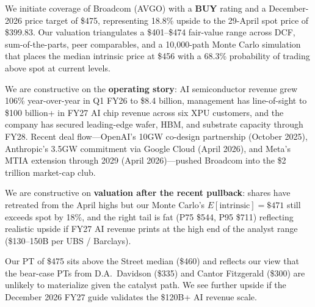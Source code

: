 \documentclass[10pt,letterpaper]{article}
\begin{document}
\begin{minipage}[t]{0.55\textwidth}
We initiate coverage of Broadcom (AVGO) with a \textbf{BUY} rating and a December-2026 price target of \$475, representing 18.8\% upside to the 29-April spot price of \$399.83. Our valuation triangulates a \$401--\$474 fair-value range across DCF, sum-of-the-parts, peer comparables, and a 10{,}000-path Monte Carlo simulation that places the median intrinsic price at \$456 with a 68.3\% probability of trading above spot at current levels.

We are constructive on the \textbf{operating story}: AI semiconductor revenue grew 106\% year-over-year in Q1 FY26 to \$8.4 billion, management has line-of-sight to \$100 billion+ in FY27 AI chip revenue across six XPU customers, and the company has secured leading-edge wafer, HBM, and substrate capacity through FY28. Recent deal flow---OpenAI's 10GW co-design partnership (October 2025), Anthropic's 3.5GW commitment via Google Cloud (April 2026), and Meta's MTIA extension through 2029 (April 2026)---pushed Broadcom into the \$2 trillion market-cap club.

We are constructive on \textbf{valuation after the recent pullback}: shares have retreated from the April highs but our Monte Carlo's $E[\text{intrinsic}] = \$471$ still exceeds spot by 18\%, and the right tail is fat (P75 \$544, P95 \$711) reflecting realistic upside if FY27 AI revenue prints at the high end of the analyst range (\$130--150B per UBS / Barclays).

Our PT of \$475 sits above the Street median (\$460) and reflects our view that the bear-case PTs from D.A.\ Davidson (\$335) and Cantor Fitzgerald (\$300) are unlikely to materialize given the catalyst path. We see further upside if the December 2026 FY27 guide validates the \$120B+ AI revenue scale.
\end{minipage}\hfill
\end{document}
